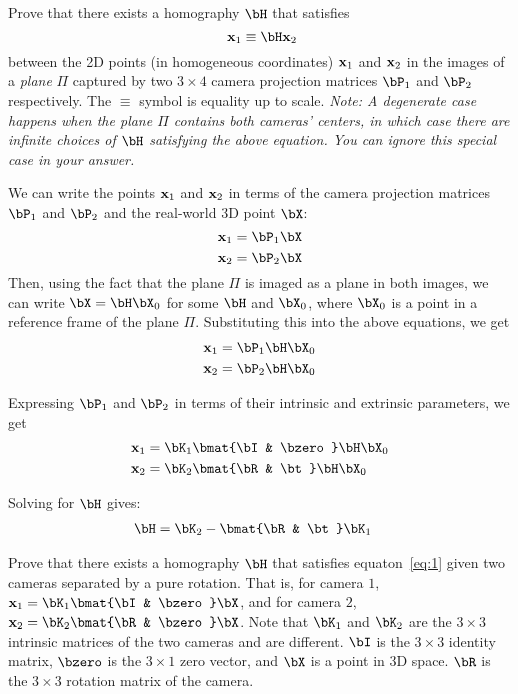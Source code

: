 \begin{problem}
  \begin{enumroman}
    \item Prove that there exists a homography $\bH$ that satisfies
      \begin{equation}~\label{eq:1}
        \bx_1 \equiv \bH \bx_2
      \end{equation}
      between the 2D points (in homogeneous coordinates) $\mathbf{x}_1$ and $\mathbf{x}_2$
      in the images of a \emph{plane} $\Pi$ captured by two $3 \times 4$ camera
      projection matrices $\bP_1$ and $\bP_2$ respectively.
      The $\equiv$ symbol is equality up to scale.
      \emph{
        Note: A degenerate case happens when the plane $\Pi$ contains both cameras'
        centers, in which case there are infinite choices of $\bH$
        satisfying the above equation.
        You can ignore this special case in your answer.
      }

      \begin{answer}
        We can write the points $\mathbf{x}_1$ and $\mathbf{x}_2$ in terms of the camera
        projection matrices $\bP_1$ and $\bP_2$ and the real-world 3D point $\bX$:
        \[ \bx_1 = \bP_1 \bX \]
        \[ \bx_2 = \bP_2 \bX \]
        Then, using the fact that the plane $\Pi$ is imaged as a plane in both images,
        we can write $\bX = \bH \bX_0$ for some $\bH$ and $\bX_0$, where $\bX_0$
        is a point in a reference frame of the plane $\Pi$.
        Substituting this into the above equations, we get
        \begin{align*}
          \bx_1 &= \bP_1 \bH \bX_0 \\
          \bx_2 &= \bP_2 \bH \bX_0
        \end{align*}

        Expressing $\bP_1$ and $\bP_2$ in terms of their intrinsic and extrinsic parameters,
        we get
        \begin{align*}
          \bx_1 &= \bK_1 \bmat{\bI & \bzero} \bH \bX_0 \\
          \bx_2 &= \bK_2 \bmat{\bR & \bt} \bH \bX_0
        \end{align*}

        Solving for $\bH$ gives:
        \begin{align*}
          \bH &= \bK_2 - \bmat{\bR & \bt} \bK_1
        \end{align*}

      \end{answer}

    \item Prove that there exists a homography $\bH$ that satisfies equaton~\ref{eq:1}
      given two cameras separated by a pure rotation.
      That is, for camera $1$, $\bx_1 = \bK_1 \bmat{\bI & \bzero} \bX$,
      and for camera $2$, $\bx_2 = \bK_2 \bmat{\bR & \bzero} \bX$.
      Note that $\bK_1$ and $\bK_2$ are the $3 \times 3$ intrinsic matrices
      of the two cameras and are different. $\bI$ is the $3 \times 3$ identity matrix,
      $\bzero$ is the $3 \times 1$ zero vector, and $\bX$ is a point in 3D space.
      $\bR$ is the $3 \times 3$ rotation matrix of the camera.


\end{enumroman}
\end{problem}
